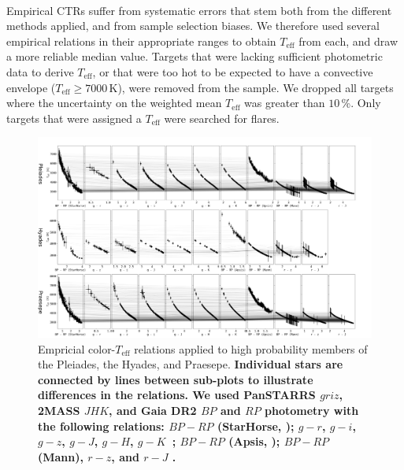 \documentclass{aa}
\begin{document}
\\
Empirical CTRs suffer from systematic errors that stem both from the different methods applied, and from sample selection biases. We therefore used several empirical relations in their appropriate ranges to obtain $T_\mathrm{eff}$ from each, and draw a more reliable median value. Targets that were lacking sufficient photometric data to derive $T_\mathrm{eff}$, or that were too hot to be expected to have a convective envelope ($T_\mathrm{eff} \geq 7000\,$K), were removed from the sample. We dropped all targets where the uncertainty on the weighted mean $T_\mathrm{eff}$ was greater than $10\,$\%. Only targets that were assigned a $T_\mathrm{eff}$ were searched for flares. 

   \begin{figure}[ht!]
		\centering
           \includegraphics[angle=90, width=0.75\hsize]{pics/clusters/Teff_spread_young.png}

      \caption{Empricial color-$T_\mathrm{eff}$ relations applied to high probability members of the Pleiades, the Hyades, and Praesepe. \textbf{Individual stars are connected by lines between sub-plots to illustrate differences in the relations. We used PanSTARRS $griz$, 2MASS $JHK$, and Gaia DR2 $BP$ and $RP$ photometry with the following relations: $BP-RP$ (StarHorse, \citealt{anders_starhorse_2019}); $g-r$, $g-i$, $g-z$, $g-J$, $g-H$, $g-K$~\citep{boyajian_stellar_2013}; $BP-RP$ (Apsis, \citealt{andrae_gaiaapsis_2018}); $BP-RP$ (Mann), $r-z$, and $r-J$ \citep{mann_erratum_2016}.}}
         \label{fig:teff_pleiades_hyades_praesepe}
   \end{figure}
   
\end{document}
